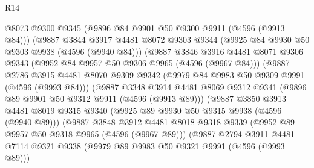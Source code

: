 \begin{lexlean}{R14}
\begin{coremodule}
                        @8073
                        @9300
                        @9345
                        (@9896 @84 @9901 @50 @9300 @9911 (@4596 (@9913 @84)))
                        (@9887
                          @3844
                          @3917
                          @4481
                          @8072
                          @9303
                          @9344
                          (@9925 @84 @9930 @50 @9303 @9938 (@4596 (@9940 @84)))
                          (@9887
                            @3846
                            @3916
                            @4481
                            @8071
                            @9306
                            @9343
                            (@9952 @84 @9957 @50 @9306 @9965 (@4596 (@9967 @84)))
                            (@9887
                              @2786
                              @3915
                              @4481
                              @8070
                              @9309
                              @9342
                              (@9979 @84 @9983 @50 @9309 @9991 (@4596 (@9993 @84)))
                              (@9887
                                @3348
                                @3914
                                @4481
                                @8069
                                @9312
                                @9341
                                (@9896 @89 @9901 @50 @9312 @9911 (@4596 (@9913 @89)))
                                (@9887
                                  @3850
                                  @3913
                                  @4481
                                  @8019
                                  @9315
                                  @9340
                                  (@9925 @89 @9930 @50 @9315 @9938 (@4596 (@9940 @89)))
                                  (@9887
                                    @3848
                                    @3912
                                    @4481
                                    @8018
                                    @9318
                                    @9339
                                    (@9952 @89 @9957 @50 @9318 @9965 (@4596 (@9967 @89)))
                                    (@9887
                                      @2794
                                      @3911
                                      @4481
                                      @7114
                                      @9321
                                      @9338
                                      (@9979 @89 @9983 @50 @9321 @9991 (@4596 (@9993 @89)))

\end{coremodule}
\end{lexlean}
